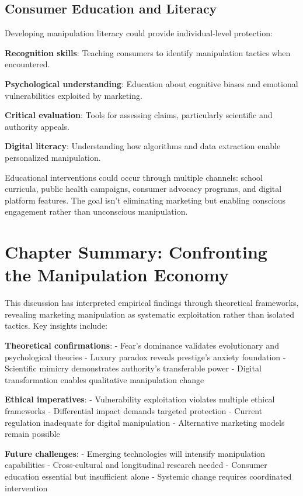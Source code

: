 \subsection{Consumer Education and Literacy}

Developing manipulation literacy could provide individual-level protection:

\textbf{Recognition skills}: Teaching consumers to identify manipulation tactics when encountered.

\textbf{Psychological understanding}: Education about cognitive biases and emotional vulnerabilities exploited by marketing.

\textbf{Critical evaluation}: Tools for assessing claims, particularly scientific and authority appeals.

\textbf{Digital literacy}: Understanding how algorithms and data extraction enable personalized manipulation.

Educational interventions could occur through multiple channels: school curricula, public health campaigns, consumer advocacy programs, and digital platform features. The goal isn't eliminating marketing but enabling conscious engagement rather than unconscious manipulation.

\section{Chapter Summary: Confronting the Manipulation Economy}
\label{sec:discussion_summary}

This discussion has interpreted empirical findings through theoretical frameworks, revealing marketing manipulation as systematic exploitation rather than isolated tactics. Key insights include:

\textbf{Theoretical confirmations}:
- Fear's dominance validates evolutionary and psychological theories
- Luxury paradox reveals prestige's anxiety foundation
- Scientific mimicry demonstrates authority's transferable power
- Digital transformation enables qualitative manipulation change

\textbf{Ethical imperatives}:
- Vulnerability exploitation violates multiple ethical frameworks
- Differential impact demands targeted protection
- Current regulation inadequate for digital manipulation
- Alternative marketing models remain possible

\textbf{Future challenges}:
- Emerging technologies will intensify manipulation capabilities
- Cross-cultural and longitudinal research needed
- Consumer education essential but insufficient alone
- Systemic change requires coordinated intervention

